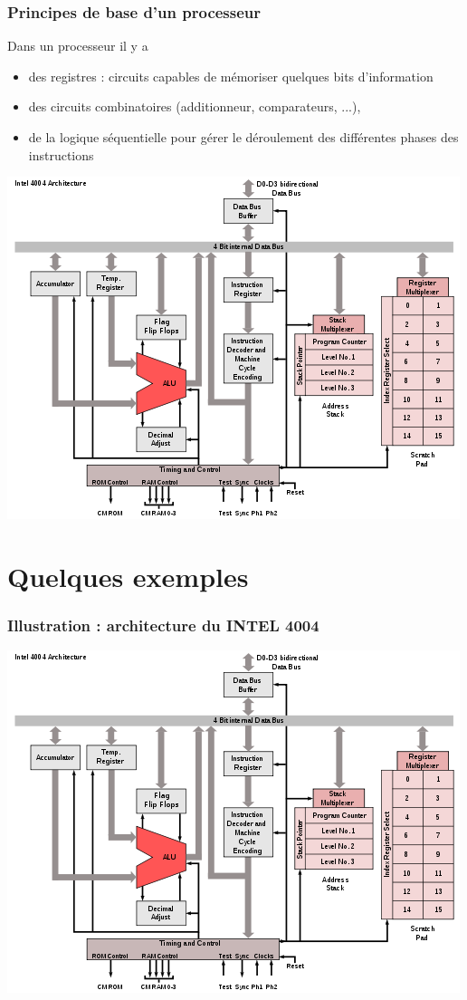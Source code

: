 \begin{frame}
  \frametitle{Principes de base d'un processeur}

\begin{multicols}{2}
Dans un processeur il y a 
\begin{itemize}
\item des \alert{registres}  : circuits capables de mémoriser
quelques bits d'information
\item  des \alert{circuits combinatoires} (additionneur, comparateurs, ...),
\item de la \alert{logique séquentielle} pour gérer  le déroulement des différentes phases des instructions
\end{itemize}

\includegraphics[width=\linewidth]{images/4004_arch.png}
\end{multicols}

\end{frame}

\section{Quelques exemples}

\begin{frame}
  \frametitle{Illustration : architecture du INTEL 4004}
  \begin{center}
  \includegraphics[width=0.8\linewidth]{images/4004_arch.png}
  \end{center}
\end{frame}


